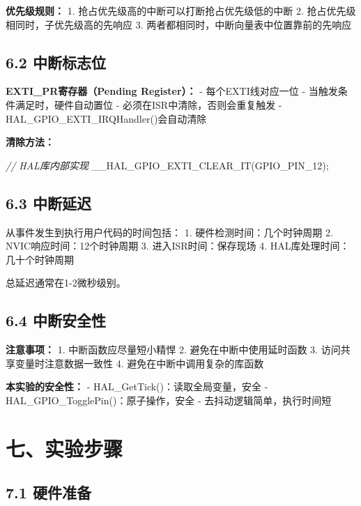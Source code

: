 \documentclass[
  chinese,
  UTF8,
  oneside,
  openany]{ctexbook}
\newenvironment{Shaded}{}{}
\newcommand{\CommentTok}[1]{\textcolor[rgb]{0.38,0.63,0.69}{\textit{#1}}}
\newcommand{\NormalTok}[1]{#1}
\newcommand{\OperatorTok}[1]{\textcolor[rgb]{0.40,0.40,0.40}{#1}}
\begin{document}
\textbf{优先级规则：} 1. 抢占优先级高的中断可以打断抢占优先级低的中断 2.
抢占优先级相同时，子优先级高的先响应 3.
两者都相同时，中断向量表中位置靠前的先响应

\subsection{6.2 中断标志位}\label{ux4e2dux65adux6807ux5fd7ux4f4d}

\textbf{EXTI\_PR寄存器（Pending Register）：} - 每个EXTI线对应一位 -
当触发条件满足时，硬件自动置位 - 必须在ISR中清除，否则会重复触发 -
HAL\_GPIO\_EXTI\_IRQHandler()会自动清除

\textbf{清除方法：}

\begin{Shaded}
\begin{Highlighting}[]
\CommentTok{// HAL库内部实现}
\NormalTok{\_\_HAL\_GPIO\_EXTI\_CLEAR\_IT}\OperatorTok{(}\NormalTok{GPIO\_PIN\_12}\OperatorTok{);}
\end{Highlighting}
\end{Shaded}

\subsection{6.3 中断延迟}\label{ux4e2dux65adux5ef6ux8fdf}

从事件发生到执行用户代码的时间包括： 1. 硬件检测时间：几个时钟周期 2.
NVIC响应时间：12个时钟周期 3. 进入ISR时间：保存现场 4.
HAL库处理时间：几十个时钟周期

总延迟通常在1-2微秒级别。

\subsection{6.4 中断安全性}\label{ux4e2dux65adux5b89ux5168ux6027}

\textbf{注意事项：} 1. 中断函数应尽量短小精悍 2.
避免在中断中使用延时函数 3. 访问共享变量时注意数据一致性 4.
避免在中断中调用复杂的库函数

\textbf{本实验的安全性：} - HAL\_GetTick()：读取全局变量，安全 -
HAL\_GPIO\_TogglePin()：原子操作，安全 - 去抖动逻辑简单，执行时间短

\section{七、实验步骤}\label{ux4e03ux5b9eux9a8cux6b65ux9aa4}

\subsection{7.1 硬件准备}\label{ux786cux4ef6ux51c6ux5907}
\end{document}
